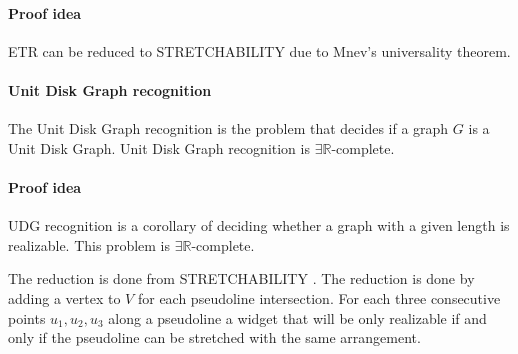 \paragraph{Proof idea} ETR can be reduced to STRETCHABILITY due to Mnev's
universality theorem. \cite{10.1007/978-3-642-11805-0_32}

\paragraph{Unit Disk Graph recognition} The Unit Disk Graph recognition is
the problem that decides if a graph $G$ is a Unit Disk Graph. Unit Disk Graph
recognition is $\exists \mathbb{R}$-complete. \cite{Schaefer2013}

\paragraph{Proof idea} UDG recognition is a corollary of deciding whether a graph
with a given length is realizable. This problem is $\exists \mathbb{R}$-complete.

The reduction is done from STRETCHABILITY \cite{Schaefer2013}. The reduction is
done by adding a vertex to $V$ for each pseudoline intersection. For each three
consecutive points $u_1, u_2, u_3$ along a pseudoline a widget that will
be only realizable if and only if the pseudoline can be stretched with the same
arrangement.
